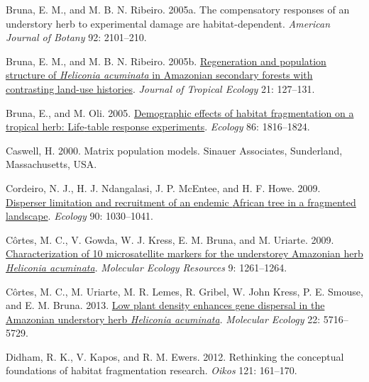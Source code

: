 \documentclass[
  man, donotrepeattitle,floatsintext]{apa6}
\newlength{\cslhangindent}
\newlength{\cslentryspacingunit} %
\newenvironment{CSLReferences}[2] %
 {%
  \setlength{\parindent}{0pt}
  \ifodd #1
  \let\oldpar\par
  \def\par{\hangindent=\cslhangindent\oldpar}
  \fi
  \setlength{\parskip}{#2\cslentryspacingunit}
 }%
 {}
\begin{document}
\begin{CSLReferences}{1}{0}
\leavevmode{}%
Bruna, E. M., and M. B. N. Ribeiro. 2005a. The compensatory responses of an understory herb to experimental damage are habitat-dependent. \emph{American Journal of Botany} 92: 2101--210.

\leavevmode{}%
Bruna, E. M., and M. B. N. Ribeiro. 2005b. \href{https://doi.org/10.1017/S0266467404002007}{Regeneration and population structure of \emph{{Heliconia} acuminata} in {Amazonian} secondary forests with contrasting land-use histories}. \emph{Journal of Tropical Ecology} 21: 127--131.

\leavevmode{}%
Bruna, E., and M. Oli. 2005. \href{https://doi.org/10.1890/04-1716}{Demographic effects of habitat fragmentation on a tropical herb: {Life}-table response experiments}. \emph{Ecology} 86: 1816--1824.

\leavevmode{}%
Caswell, H. 2000. Matrix population models. Sinauer Associates, Sunderland, Massachusetts, USA.

\leavevmode{}%
Cordeiro, N. J., H. J. Ndangalasi, J. P. McEntee, and H. F. Howe. 2009. \href{https://doi.org/10.1890/07-1208.1}{Disperser limitation and recruitment of an endemic {African} tree in a fragmented landscape}. \emph{Ecology} 90: 1030--1041.

\leavevmode{}%
Côrtes, M. C., V. Gowda, W. J. Kress, E. M. Bruna, and M. Uriarte. 2009. \href{https://doi.org/10.1111/j.1755-0998.2009.02627.x}{Characterization of 10 microsatellite markers for the understorey {Amazonian} herb \emph{{Heliconia} acuminata}}. \emph{Molecular Ecology Resources} 9: 1261--1264.

\leavevmode{}%
Côrtes, M. C., M. Uriarte, M. R. Lemes, R. Gribel, W. John Kress, P. E. Smouse, and E. M. Bruna. 2013. \href{https://doi.org/10.1111/mec.12495}{Low plant density enhances gene dispersal in the {Amazonian} understory herb \emph{{Heliconia} acuminata}}. \emph{Molecular Ecology} 22: 5716--5729.

\leavevmode{}%
Didham, R. K., V. Kapos, and R. M. Ewers. 2012. Rethinking the conceptual foundations of habitat fragmentation research. \emph{Oikos} 121: 161--170.


\end{CSLReferences}
\end{document}
